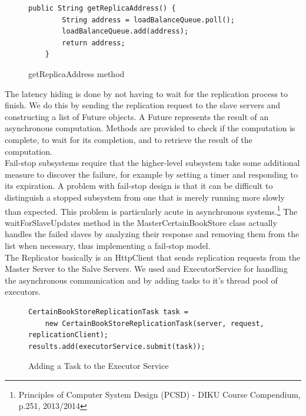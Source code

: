 \documentclass{article}      %
\begin{document}
\begin{figure}[htbp]
\begin{center}
\begin{lstlisting}
public String getReplicaAddress() {
		String address = loadBalanceQueue.poll();
		loadBalanceQueue.add(address);
		return address;
	}
\end{lstlisting}
\caption{getReplicaAddress method}
\label{getReplicaAddress method}
\end{center}
\end{figure}

The latency hiding is done by not having to wait for the replication process to finish. We do this by sending the replication request to the slave servers and constructing a list of Future objects. A Future represents the result of an asynchronous computation. Methods are provided to check if the computation is complete, to wait for its completion, and to retrieve the result of the computation. \\ 

Fail-stop subsystems require that the higher-level subsystem take some additional measure to discover the failure, for example by setting a timer and responding to its expiration. A problem with fail-stop design is that it can be difficult to distinguish a stopped subsystem from one that is merely running more slowly than expected. This problem is particularly acute in asynchronous systems.\footnote{Principles of Computer System Design (PCSD) - DIKU Course Compendium, p.251, 2013/2014} The waitForSlaveUpdates method in the MasterCertainBookStore class actually handles the failed slaves by analyzing their response and removing them from the list when necessary, thus implementing a fail-stop model. \\ 

The Replicator basically is an HttpClient that sends replication requests  from the Master Server to the Salve Servers. We used and ExecutorService for handling the asynchronous communication and by adding tasks to it's thread pool of executors.\\

\begin{figure}[htbp]
\begin{center}
\begin{lstlisting}
CertainBookStoreReplicationTask task = 
	new CertainBookStoreReplicationTask(server, request, replicationClient);
results.add(executorService.submit(task));
\end{lstlisting}
\caption{Adding a Task to the Executor Service}
\label{Adding a Task to the Executor Service}
\end{center}
\end{figure}
\end{document}
